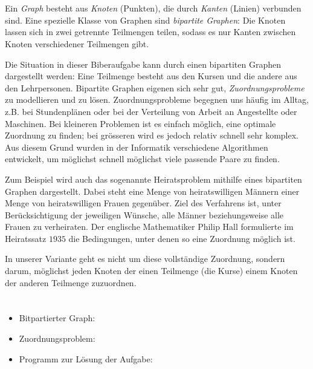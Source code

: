 {{%
\section*{\BrochureItsInformatics}
Ein \emph{Graph} besteht aus \emph{Knoten} (Punkten), die durch \emph{Kanten} (Linien) verbunden sind. Eine spezielle Klasse von Graphen sind \emph{bipartite Graphen}: Die Knoten lassen sich in zwei getrennte Teilmengen teilen, sodass es nur Kanten zwischen Knoten verschiedener Teilmengen gibt.

{\centering%
\par}

Die Situation in dieser Biberaufgabe kann durch einen bipartiten Graphen dargestellt werden: Eine Teilmenge besteht aus den Kursen und die andere aus den Lehrpersonen. Bipartite Graphen eigenen sich sehr gut, \emph{Zuordnungsprobleme} zu modellieren und zu lösen. Zuordnungsprobleme begegnen uns häufig im Alltag, z.B. bei Stundenplänen oder bei der Verteilung von Arbeit an Angestellte oder Maschinen. Bei kleineren Problemen ist es einfach möglich, eine optimale Zuordnung zu finden; bei grösseren wird es jedoch relativ schnell sehr komplex. Aus diesem Grund wurden in der Informatik verschiedene Algorithmen entwickelt, um möglichst schnell möglichst viele passende Paare zu finden.

Zum Beispiel wird auch das sogenannte Heiratsproblem mithilfe eines bipartiten Graphen dargestellt. Dabei steht eine Menge von heiratswilligen Männern einer Menge von heiratswilligen Frauen gegenüber. Ziel des Verfahrens ist, unter Berücksichtigung der jeweiligen Wünsche, alle Männer beziehungsweise alle Frauen zu verheiraten. Der englische Mathematiker Philip Hall formulierte im Heiratssatz $1935$ die Bedingungen, unter denen so eine Zuordnung möglich ist.

In unserer Variante geht es nicht um diese vollständige Zuordnung, sondern darum, möglichst jeden Knoten der einen Teilmenge (die Kurse) einem Knoten der anderen Teilmenge zuzuordnen.



\section*{\BrochureWebsitesAndKeywords}
{\raggedright
\begin{itemize}
  \item Bitpartierter Graph: \href{https://de.wikipedia.org/wiki/Bipartiter_Graph}{}
  \item Zuordnungsproblem: \href{https://de.wikipedia.org/wiki/Zuordnungsproblem}{}
  \item Programm zur Lösung der Aufgabe: \href{https://www.coding4you.at/dachu_2023/ir02/index.html}{}
\end{itemize}


}}}
